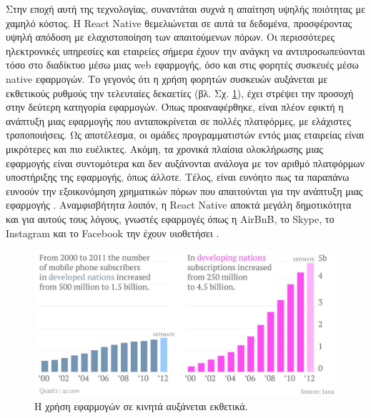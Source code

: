 Στην εποχή αυτή της τεχνολογίας, συναντάται συχνά η απαίτηση υψηλής ποιότητας με χαμηλό κόστος. Η React Native θεμελιώνεται σε αυτά τα δεδομένα, προσφέροντας υψηλή απόδοση με ελαχιστοποίηση των απαιτούμενων πόρων. Οι περισσότερες ηλεκτρονικές υπηρεσίες και εταιρείες σήμερα έχουν την ανάγκη να αντιπροσωπεύονται τόσο στο διαδίκτυο μέσω μιας web εφαρμογής, όσο και στις φορητές συσκευές μέσω native εφαρμογών. Το γεγονός ότι η χρήση φορητών συσκευών αυξάνεται με εκθετικούς ρυθμούς την τελευταίες δεκαετίες (βλ. Σχ. \ref{mobileusage}), έχει στρέψει την προσοχή στην δεύτερη κατηγορία εφαρμογών.  Όπως προαναφέρθηκε, είναι πλέον εφικτή η ανάπτυξη μιας εφαρμογής που ανταποκρίνεται σε πολλές πλατφόρμες, με ελάχιστες τροποποιήσεις. Ως αποτέλεσμα, οι ομάδες προγραμματιστών εντός μιας εταιρείας είναι μικρότερες και πιο ευέλικτες. Ακόμη, τα χρονικά πλαίσια ολοκλήρωσης μιας εφαρμογής είναι συντομότερα και δεν αυξάνονται ανάλογα με τον αριθμό πλατφόρμων υποστήριξης της εφαρμογής, όπως άλλοτε. Τέλος, είναι ευνόητο πως τα παραπάνω ευνοούν την εξοικονόμηση χρηματικών πόρων που απαιτούνται για την ανάπτυξη μιας εφαρμογής \cite{[RN2]}. Αναμφισβήτητα λοιπόν, η React Native αποκτά μεγάλη δημοτικότητα και για αυτούς τους λόγους, γνωστές εφαρμογές όπως η AirBnB, το Skype, το Instagram και το Facebook την έχουν υιοθετήσει \cite{[RN3]}.

\begin{figure}
    \centering
    \includegraphics[scale=0.4]{figures/mobile-use.png}
    \caption{Η χρήση εφαρμογών σε κινητά αυξάνεται εκθετικά.}
    \label{mobileusage}
\end{figure}


